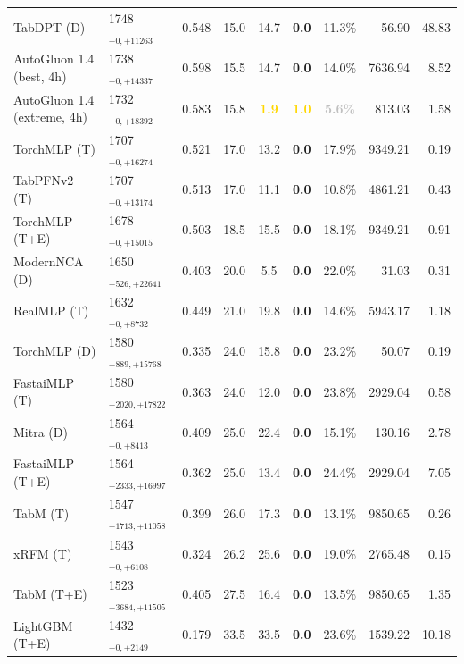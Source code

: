 \begin{tabular}{llcccccrr}
TabDPT (D) & 1748${}_{-0,+11263}$ & 0.548 & 15.0 & 14.7 & \textcolor{bronze}{\textbf{0.0}} & 11.3\% & 56.90 & 48.83 \\
AutoGluon 1.4 (best, 4h) & 1738${}_{-0,+14337}$ & 0.598 & 15.5 & 14.7 & \textcolor{bronze}{\textbf{0.0}} & 14.0\% & 7636.94 & 8.52 \\
AutoGluon 1.4 (extreme, 4h) & 1732${}_{-0,+18392}$ & 0.583 & 15.8 & \textcolor{gold}{\textbf{1.9}} & \textcolor{gold}{\textbf{1.0}} & \textcolor{silver}{\textbf{5.6\%}} & 813.03 & 1.58 \\
TorchMLP (T) & 1707${}_{-0,+16274}$ & 0.521 & 17.0 & 13.2 & \textcolor{bronze}{\textbf{0.0}} & 17.9\% & 9349.21 & 0.19 \\
TabPFNv2 (T) & 1707${}_{-0,+13174}$ & 0.513 & 17.0 & 11.1 & \textcolor{bronze}{\textbf{0.0}} & 10.8\% & 4861.21 & 0.43 \\
TorchMLP (T+E) & 1678${}_{-0,+15015}$ & 0.503 & 18.5 & 15.5 & \textcolor{bronze}{\textbf{0.0}} & 18.1\% & 9349.21 & 0.91 \\
ModernNCA (D) & 1650${}_{-526,+22641}$ & 0.403 & 20.0 & 5.5 & \textcolor{bronze}{\textbf{0.0}} & 22.0\% & 31.03 & 0.31 \\
RealMLP (T) & 1632${}_{-0,+8732}$ & 0.449 & 21.0 & 19.8 & \textcolor{bronze}{\textbf{0.0}} & 14.6\% & 5943.17 & 1.18 \\
TorchMLP (D) & 1580${}_{-889,+15768}$ & 0.335 & 24.0 & 15.8 & \textcolor{bronze}{\textbf{0.0}} & 23.2\% & 50.07 & 0.19 \\
FastaiMLP (T) & 1580${}_{-2020,+17822}$ & 0.363 & 24.0 & 12.0 & \textcolor{bronze}{\textbf{0.0}} & 23.8\% & 2929.04 & 0.58 \\
Mitra (D) & 1564${}_{-0,+8413}$ & 0.409 & 25.0 & 22.4 & \textcolor{bronze}{\textbf{0.0}} & 15.1\% & 130.16 & 2.78 \\
FastaiMLP (T+E) & 1564${}_{-2333,+16997}$ & 0.362 & 25.0 & 13.4 & \textcolor{bronze}{\textbf{0.0}} & 24.4\% & 2929.04 & 7.05 \\
TabM (T) & 1547${}_{-1713,+11058}$ & 0.399 & 26.0 & 17.3 & \textcolor{bronze}{\textbf{0.0}} & 13.1\% & 9850.65 & 0.26 \\
xRFM (T) & 1543${}_{-0,+6108}$ & 0.324 & 26.2 & 25.6 & \textcolor{bronze}{\textbf{0.0}} & 19.0\% & 2765.48 & 0.15 \\
TabM (T+E) & 1523${}_{-3684,+11505}$ & 0.405 & 27.5 & 16.4 & \textcolor{bronze}{\textbf{0.0}} & 13.5\% & 9850.65 & 1.35 \\
LightGBM (T+E) & 1432${}_{-0,+2149}$ & 0.179 & 33.5 & 33.5 & \textcolor{bronze}{\textbf{0.0}} & 23.6\% & 1539.22 & 10.18 \\

\end{tabular}
